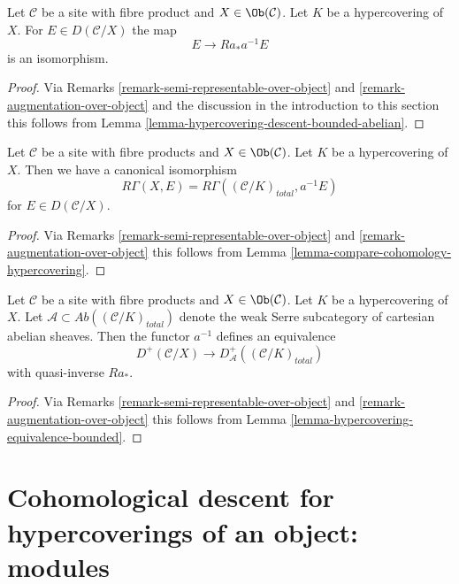 \begin{lemma}
\label{lemma-hypercovering-X-descent-bounded-abelian}
Let $\mathcal{C}$ be a site with fibre product and $X \in \Ob(\mathcal{C})$.
Let $K$ be a hypercovering of $X$. For
$E \in D(\mathcal{C}/X)$ the map
$$
E \longrightarrow Ra_*a^{-1}E
$$
is an isomorphism.
\end{lemma}

\begin{proof}
Via Remarks \ref{remark-semi-representable-over-object} and
\ref{remark-augmentation-over-object} and the discussion in
the introduction to this section
this follows from Lemma \ref{lemma-hypercovering-descent-bounded-abelian}.
\end{proof}

\begin{lemma}
\label{lemma-compare-cohomology-hypercovering-X}
Let $\mathcal{C}$ be a site with fibre products and $X \in \Ob(\mathcal{C})$.
Let $K$ be a hypercovering of $X$.
Then we have a canonical isomorphism
$$
R\Gamma(X, E) = R\Gamma((\mathcal{C}/K)_{total}, a^{-1}E)
$$
for $E \in D(\mathcal{C}/X)$.
\end{lemma}

\begin{proof}
Via Remarks \ref{remark-semi-representable-over-object} and
\ref{remark-augmentation-over-object}
this follows from Lemma \ref{lemma-compare-cohomology-hypercovering}.
\end{proof}

\begin{lemma}
\label{lemma-hypercovering-X-equivalence-bounded}
Let $\mathcal{C}$ be a site with fibre products and $X \in \Ob(\mathcal{C})$.
Let $K$ be a hypercovering of $X$.
Let $\mathcal{A} \subset \textit{Ab}((\mathcal{C}/K)_{total})$
denote the weak Serre subcategory of cartesian abelian sheaves.
Then the functor $a^{-1}$ defines an equivalence
$$
D^+(\mathcal{C}/X) \longrightarrow D_\mathcal{A}^+((\mathcal{C}/K)_{total})
$$
with quasi-inverse $Ra_*$.
\end{lemma}

\begin{proof}
Via Remarks \ref{remark-semi-representable-over-object} and
\ref{remark-augmentation-over-object}
this follows from Lemma \ref{lemma-hypercovering-equivalence-bounded}.
\end{proof}








\section{Cohomological descent for hypercoverings of an object: modules}
\label{section-cohomological-descent-hypercoverings-X-modules}

